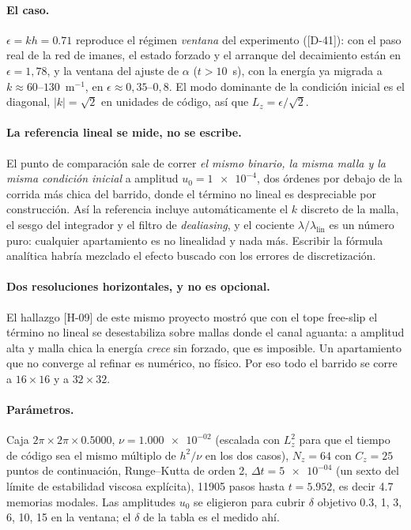 \documentclass[11pt,a4paper]{article}
\begin{document}
\paragraph{El caso.} $\epsilon = kh = 0.71$ reproduce el régimen \emph{ventana} del
experimento ([D-41]): con el paso real de la red de imanes, el estado forzado y el arranque
del decaimiento están en $\epsilon = 1{,}78$, y la ventana del ajuste de $\alpha$
($t > 10$~s), con la energía ya migrada a $k \approx 60$--$130$~m$^{-1}$, en
$\epsilon \approx 0{,}35$--$0{,}8$. El modo dominante de la condición inicial es el diagonal,
$|k| = \sqrt2$ en unidades de código, así que $L_z = \epsilon/\sqrt2$.

\paragraph{La referencia lineal se mide, no se escribe.} El punto de comparación sale de
correr \emph{el mismo binario, la misma malla y la misma condición inicial} a amplitud
$u_0 = \num{1e-4}$, dos órdenes por debajo de la corrida más chica del barrido, donde
el término no lineal es despreciable por construcción. Así la referencia incluye
automáticamente el $k$ discreto de la malla, el sesgo del integrador y el filtro de
\emph{dealiasing}, y el cociente $\lambda/\lambda_\text{lin}$ es un número puro:
cualquier apartamiento es no linealidad y nada más. Escribir la fórmula analítica habría
mezclado el efecto buscado con los errores de discretización.

\paragraph{Dos resoluciones horizontales, y no es opcional.} El hallazgo [H-09] de este
mismo proyecto mostró que con el tope free-slip el término no lineal se desestabiliza sobre
mallas donde el canal aguanta: a amplitud alta y malla chica la energía \emph{crece} sin
forzado, que es imposible. Un apartamiento que no converge al refinar es numérico, no
físico. Por eso todo el barrido se corre a $16\times16$ y a $32\times32$.

\paragraph{Parámetros.} Caja $2\pi\times2\pi\times0.5000$, $\nu = \num{1.000e-02}$
(escalada con $L_z^2$ para que el tiempo de código sea el mismo múltiplo de $h^2/\nu$ en
los dos casos), $N_z = 64$ con $C_z = 25$ puntos de continuación, Runge--Kutta de
orden 2, $\Delta t = \num{5e-04}$ (un sexto del límite de estabilidad viscosa
explícita), 11905 pasos hasta $t = 5.952$, es decir 4.7 memorias
modales. Las amplitudes $u_0$ se eligieron para cubrir $\delta$ objetivo
0.3, 1, 3, 6, 10, 15 en la ventana; el $\delta$ de la tabla es el medido ahí.
\end{document}
